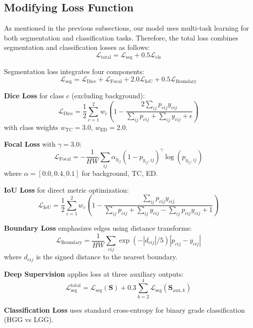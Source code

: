 \documentclass[runningheads]{llncs}
\begin{document}
\subsection{Modifying Loss Function}

As mentioned in the previous subsections, our model uses multi-task learning for both segmentation and classification tasks. Therefore, the total loss combines segmentation and classification losses as follows:
\begin{equation}
\mathcal{L}_{\text{total}} = \mathcal{L}_{\text{seg}} + 0.5 \mathcal{L}_{\text{cls}}
\label{eq:total_loss}
\end{equation}

Segmentation loss integrates four components:
\begin{equation}
\mathcal{L}_{\text{seg}} = \mathcal{L}_{\text{Dice}} + \mathcal{L}_{\text{Focal}} + 2.0\mathcal{L}_{\text{IoU}} + 0.5\mathcal{L}_{\text{Boundary}}
\label{eq:seg_loss}
\end{equation}

\textbf{Dice Loss} for class $c$ (excluding background):
\[
\mathcal{L}_{\text{Dice}} = \frac{1}{2}\sum_{c=1}^{2} w_c \left(1 - \frac{2\sum_{ij} p_{cij} y_{cij}}{\sum_{ij} p_{cij} + \sum_{ij} y_{cij} + \epsilon}\right)
\]
with class weights $w_{\text{TC}}=3.0$, $w_{\text{ED}}=2.0$.

\textbf{Focal Loss} with $\gamma=3.0$:
\[
\mathcal{L}_{\text{Focal}} = -\frac{1}{HW}\sum_{ij} \alpha_{y_{ij}} (1-p_{y_{ij},ij})^{\gamma} \log(p_{y_{ij},ij})
\]
where $\alpha = [0.0, 0.4, 0.1]$ for background, TC, ED.

\textbf{IoU Loss} for direct metric optimization:
\[
\mathcal{L}_{\text{IoU}} = \frac{1}{2}\sum_{c=1}^{2} w_c \left(1 - \frac{\sum_{ij} p_{cij} y_{cij}}{\sum_{ij} p_{cij} + \sum_{ij} y_{cij} - \sum_{ij} p_{cij} y_{cij} + 1}\right)
\]

\textbf{Boundary Loss} emphasizes edges using distance transforms:
\[
\mathcal{L}_{\text{Boundary}} = \frac{1}{HW}\sum_{cij} \exp(-|d_{cij}|/5) |p_{cij} - y_{cij}|
\]
where $d_{cij}$ is the signed distance to the nearest boundary.

\textbf{Deep Supervision} applies loss at three auxiliary outputs:
\[
\mathcal{L}_{\text{seg}}^{\text{total}} = \mathcal{L}_{\text{seg}}(\mathbf{S}) + 0.3\sum_{k=2}^{4} \mathcal{L}_{\text{seg}}(\mathbf{S}_{\text{aux},k})
\]

\textbf{Classification Loss} uses standard cross-entropy for binary grade classification (HGG vs LGG).
\end{document}
